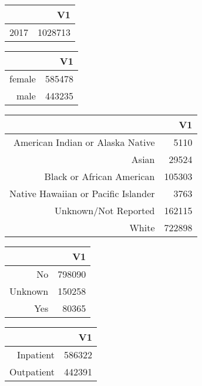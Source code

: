 \bigskip\bigskip
\centering
\begin{tabular}{rr}
  \hline
 & V1 \\ 
  \hline
2017 & 1028713 \\ 
   \hline
\end{tabular}

\bigskip\bigskip
\centering
\begin{tabular}{rr}
  \hline
 & V1 \\ 
  \hline
female & 585478 \\ 
  male & 443235 \\ 
   \hline
\end{tabular}

\bigskip\bigskip
\centering
\begin{tabular}{rr}
  \hline
 & V1 \\ 
  \hline
American Indian or Alaska Native & 5110 \\ 
  Asian & 29524 \\ 
  Black or African American & 105303 \\ 
  Native Hawaiian or Pacific Islander & 3763 \\ 
  Unknown/Not Reported & 162115 \\ 
  White & 722898 \\ 
   \hline
\end{tabular}

\bigskip\bigskip
\centering
\begin{tabular}{rr}
  \hline
 & V1 \\ 
  \hline
No & 798090 \\ 
  Unknown & 150258 \\ 
  Yes & 80365 \\ 
   \hline
\end{tabular}

\bigskip\bigskip
\centering
\begin{tabular}{rr}
  \hline
 & V1 \\ 
  \hline
Inpatient & 586322 \\ 
  Outpatient & 442391 \\ 
   \hline
\end{tabular}


